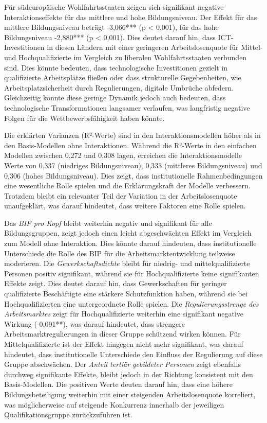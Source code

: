 Für südeuropäische Wohlfahrtsstaaten zeigen sich signifikant negative Interaktionseffekte für das 
mittlere und hohe Bildungsniveau. Der Effekt für das mittlere Bildungsniveau beträgt -3,066*** 
(p < 0,001), für das hohe Bildungsniveau -2,880*** (p < 0,001). Dies deutet darauf hin, dass 
\ac{ICT}-Investitionen in diesen Ländern mit einer geringeren Arbeitslosenquote für Mittel- und 
Hochqualifizierte im Vergleich zu liberalen Wohlfahrtsstaaten verbunden sind. Dies könnte 
bedeuten, dass technologische Investitionen gezielt in qualifizierte Arbeitsplätze fließen oder 
dass strukturelle Gegebenheiten, wie Arbeitsplatzsicherheit durch Regulierungen, digitale 
Umbrüche abfedern. Gleichzeitig könnte diese geringe Dynamik jedoch auch bedeuten, dass 
technologische Transformationen langsamer verlaufen, was langfristig negative Folgen für die 
Wettbewerbsfähigkeit haben könnte.

Die erklärten Varianzen (R²-Werte) sind in den Interaktionsmodellen höher als in den 
Basis-Modellen ohne Interaktionen. Während die R²-Werte in den einfachen Modellen zwischen 
0,272 und 0,308 lagen, erreichen die Interaktionsmodelle Werte von 0,337 
(niedriges Bildungsniveau), 0,333 (mittleres Bildungsniveau) und 0,306 (hohes Bildungsniveau). 
Dies zeigt, dass institutionelle Rahmenbedingungen eine wesentliche Rolle spielen und die 
Erklärungskraft der Modelle verbessern. Trotzdem bleibt ein relevanter Teil der Variation in der 
Arbeitslosenquote unaufgeklärt, was darauf hindeutet, dass weitere Faktoren eine Rolle spielen.

Das \textit{\ac{BIP} pro Kopf} bleibt weiterhin negativ und signifikant für alle Bildungsgruppen, 
zeigt jedoch einen leicht abgeschwächten Effekt im Vergleich zum Modell ohne Interaktion. Dies 
könnte darauf hindeuten, dass institutionelle Unterschiede die Rolle des 
\ac{BIP} für die Arbeitsmarktentwicklung teilweise moderieren. Die \textit{Gewerkschaftsdichte} 
bleibt für niedrig- und mittelqualifizierte Personen positiv signifikant, während sie für 
Hochqualifizierte keine signifikanten Effekte zeigt. Dies deutet darauf hin, dass Gewerkschaften 
für geringer qualifizierte Beschäftigte eine stärkere Schutzfunktion haben, während sie bei 
Hochqualifizierten eine untergeordnete Rolle spielen. Die 
\textit{Regulierungsstrenge des Arbeitsmarktes} zeigt für Hochqualifizierte weiterhin eine 
signifikant negative Wirkung (-0,091**), was darauf hindeutet, dass strengere 
Arbeitsmarktregulierungen in dieser Gruppe schützend wirken können. Für Mittelqualifizierte ist 
der Effekt hingegen nicht mehr signifikant, was darauf hindeutet, dass institutionelle 
Unterschiede den Einfluss der Regulierung auf diese Gruppe abschwächen. Der 
\textit{Anteil tertiär gebildeter Personen} zeigt ebenfalls durchweg signifikante Effekte, bleibt 
jedoch in der Richtung konsistent mit den Basis-Modellen. Die positiven Werte deuten darauf hin, 
dass eine höhere Bildungsbeteiligung weiterhin mit einer steigenden Arbeitslosenquote korreliert, 
was möglicherweise auf steigende Konkurrenz innerhalb der jeweiligen Qualifikationsgruppe 
zurückzuführen ist.

